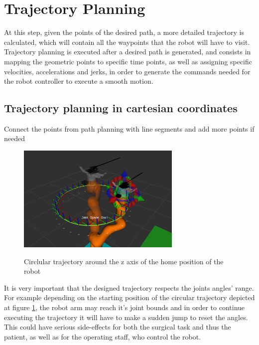 \section{Trajectory Planning}

At this step, given the points of the desired path, a more detailed trajectory is calculated, 
which will contain all the waypoints that the robot will have to visit. Trajectory planning is executed after a desired path is generated,
and consists in mapping the geometric points to specific time points, as well as assigning specific velocities, accelerations and jerks, 
in order to generate the commands needed for the robot controller to execute a smooth motion.

\subsection{Trajectory planning in cartesian coordinates}

Connect the points from path planning with line segments and add more points if needed

\begin{center}
\begin{figure}[H]
\centering
\includegraphics[width=0.7\textwidth]{images/simple_circular_traj1.png}\\
\caption{Circlular trajectory around the z axis of the home position of the robot}
\label{fig:circ-traj-out-of-angle-range}
\end{figure}
\end{center}

It is very important that the designed trajectory respects the joints angles' range. For example
depending on the starting position of the circular trajectory depicted at figure 
\ref{fig:circ-traj-out-of-angle-range}, the robot arm may reach it's joint bounds and in order to 
continue executing the trajectory it will have to make a sudden jump to reset the angles. 
This could have serious side-effects for both the surgical task and thus the patient, as well as 
for the operating staff, who control the robot.

